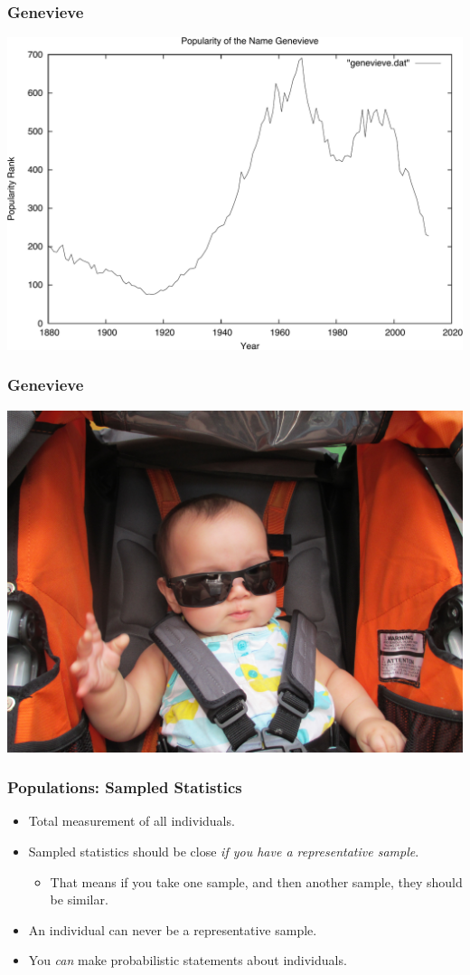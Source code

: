 \documentclass{beamer}
\begin{document}

\begin{frame}
	\frametitle{Genevieve}
    \begin{center}
        \includegraphics[width=0.8\hsize]{art/genevieveyears}
    \end{center}
\end{frame}

\begin{frame}
	\frametitle{Genevieve}
    \begin{center}
        \includegraphics[width=0.8\hsize]{art/genevievedaughter}
    \end{center}
\end{frame}


\begin{frame}
\frametitle{Populations:  Sampled Statistics}
\begin{itemize}
    \item Total measurement of all individuals.
    \item Sampled statistics should be close \emph{if you have a
        representative sample}.
    \begin{itemize}
        \item That means if you take one sample, and then another sample, they
            should be similar.
    \end{itemize}
    \item An individual can never be a representative sample.
    \item You \emph{can} make probabilistic statements about individuals.
\end{itemize}
\end{frame}
\end{document}
